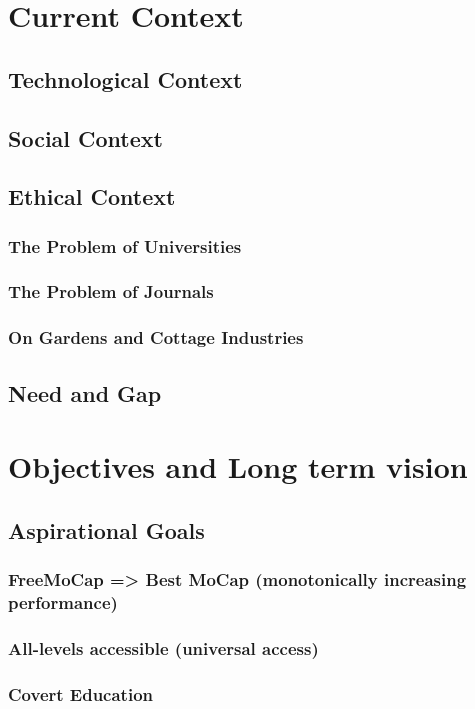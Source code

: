 \documentclass[11pt]{article}
\begin{document}
\newpage

\section{Current Context}
\subsection{Technological Context}
\subsection{Social Context}
\subsection{Ethical Context}
\subsubsection{The Problem of Universities}
\subsubsection{The Problem of Journals}
\subsubsection{On Gardens and Cottage Industries}
\subsection{Need and Gap}

\section{Objectives and Long term vision}
\subsection{Aspirational Goals}
\subsubsection{FreeMoCap => Best MoCap (monotonically increasing performance)}
\subsubsection{All-levels accessible (universal access)}
\subsubsection{Covert Education}
\end{document}
